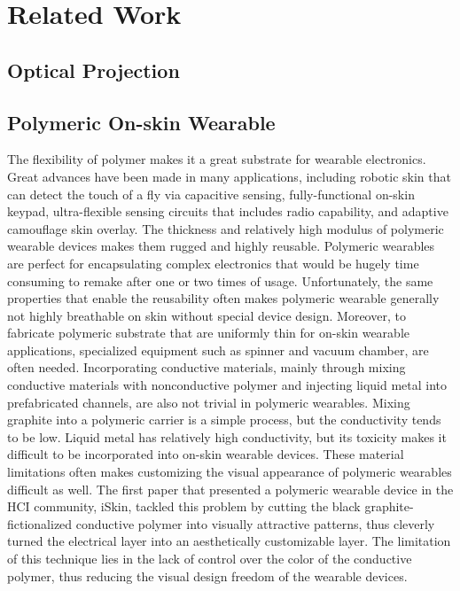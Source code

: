 \documentclass{sigchi}
\begin{document}
\section{Related Work}
\subsection{Optical Projection}
\subsection{Polymeric On-skin Wearable}
The flexibility of polymer makes it a great substrate for wearable electronics. Great advances have been made in many applications, including robotic skin that can detect the touch of a fly via capacitive sensing, fully-functional on-skin keypad, ultra-flexible sensing circuits that includes radio capability, and adaptive camouflage skin overlay. The thickness and relatively high modulus of polymeric wearable devices makes them rugged and highly reusable. Polymeric wearables are perfect for encapsulating complex electronics that would be hugely time consuming to remake after one or two times of usage. Unfortunately, the same properties that enable the reusability often makes polymeric wearable generally not highly breathable on skin without special device design. Moreover, to fabricate polymeric substrate that are uniformly thin for on-skin wearable applications, specialized equipment such as spinner and vacuum chamber, are often needed. Incorporating conductive materials, mainly through mixing conductive materials with nonconductive polymer and injecting liquid metal into prefabricated channels, are also not trivial in polymeric wearables. Mixing graphite into a polymeric carrier is a simple process, but the conductivity tends to be low. Liquid metal has relatively high conductivity, but its toxicity makes it difficult to be incorporated into on-skin wearable devices. These material limitations often makes customizing the visual appearance of polymeric wearables difficult as well. The first paper that presented a polymeric wearable device in the HCI community, iSkin, tackled this problem by cutting the black graphite-fictionalized conductive polymer into visually attractive patterns, thus cleverly turned the electrical layer into an aesthetically customizable layer. The limitation of this technique lies in the lack of control over the color of the conductive polymer, thus reducing the visual design freedom of the wearable devices. 
\end{document}
